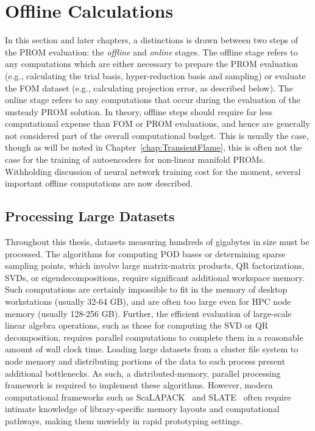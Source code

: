 \section{Offline Calculations}

In this section and later chapters, a distinctions is drawn between two steps of the PROM evaluation: the \textit{offline} and \textit{online} stages. The offline stage refers to any computations which are either necessary to prepare the PROM evaluation (e.g., calculating the trial basis, hyper-reduction basis and sampling) or evaluate the FOM dataset (e.g., calculating projection error, as described below). The online stage refers to any computations that occur during the evaluation of the unsteady PROM solution. In theory, offline steps should require far less computational expense than FOM or PROM evaluations, and hence are generally not considered part of the overall computational budget. This is usually the case, though as will be noted in Chapter~\ref{chap:TransientFlame}, this is often not the case for the training of autoencoders for non-linear manifold PROMs. Withholding discussion of neural network training cost for the moment, several important offline computations are now described.

\subsection{Processing Large Datasets}\label{sec:platform}
%
Throughout this thesis, datasets measuring hundreds of gigabytes in size must be processed. The algorithms for computing POD bases or determining sparse sampling points, which involve large matrix-matrix products, QR factorizations, SVDs, or eigendecompositions, require significant additional workspace memory. Such computations are certainly impossible to fit in the memory of desktop workstations (usually 32-64 GB), and are often too large even for HPC node memory (usually 128-256 GB). Further, the efficient evaluation of large-scale linear algebra operations, such as those for computing the SVD or QR decomposition, requires parallel computations to complete them in a reasonable amount of wall clock time. Loading large datasets from a cluster file system to node memory and distributing portions of the data to each process present additional bottlenecks. As such, a distributed-memory, parallel processing framework is required to implement these algorithms. However, modern computational frameworks such as ScaLAPACK~\cite{scalapack} and SLATE~\cite{slate} often require intimate knowledge of library-specific memory layouts and computational pathways, making them unwieldy in rapid prototyping settings.

